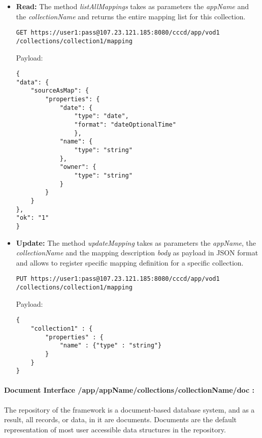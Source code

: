 \begin{itemize}

\item \textbf{Read:} The method \textit{listAllMappings} takes as parameters the \textit{appName} and the \textit{collectionName} and returns the entire mapping list for this collection.

\begin{code}
\begin{verbatim}
GET https://user1:pass@107.23.121.185:8080/cccd/app/vod1
/collections/collection1/mapping
\end{verbatim}
Payload:
\begin{verbatim}
{
"data": {
	"sourceAsMap": {
		"properties": {
			"date": {
				"type": "date",
				"format": "dateOptionalTime"
				},
			"name": {
				"type": "string"
			},
			"owner": {
				"type": "string"
			}
		}
	}
},
"ok": "1"
}

\end{verbatim}
\end{code}

\item \textbf{Update:} The method \textit{updateMapping} takes as parameters the \textit{appName}, the \textit{collectionName} and the mapping description \textit{body} as payload in JSON format and allows to register specific mapping definition for a specific collection.

\begin{code}
\begin{verbatim}
PUT https://user1:pass@107.23.121.185:8080/cccd/app/vod1
/collections/collection1/mapping
\end{verbatim}
Payload:
\begin{verbatim}
{
	"collection1" : {
		"properties" : {
			"name" : {"type" : "string"}
		}
	}
}
\end{verbatim}
\end{code}

\end{itemize}


\paragraph{Document Interface /app/{appName}/collections/{collectionName}/doc :} The repository of the framework is a document-based database system, and as a result, all records, or data, in it are documents. Documents are the default representation of most user accessible data structures in the repository.

